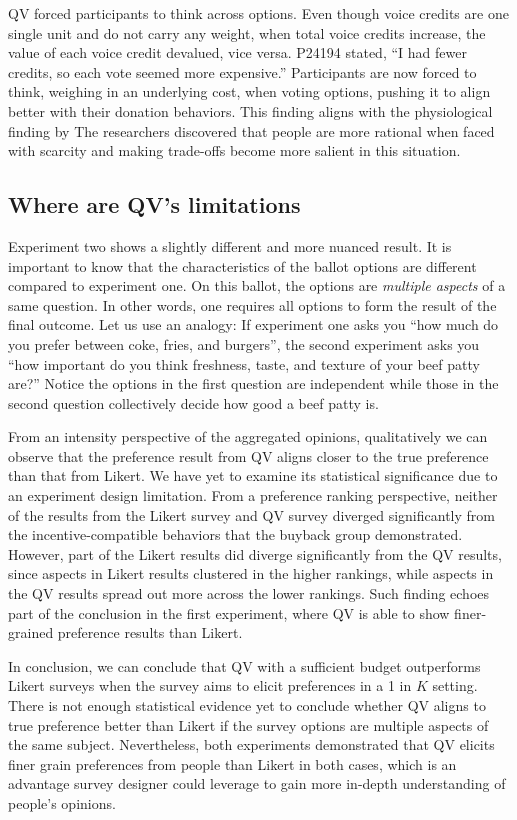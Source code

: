 QV forced participants to think across options. 
Even though voice credits are one single unit 
and do not carry any weight, 
when total voice credits increase, 
the value of each voice credit devalued, 
vice versa. 
P24194 stated, 
``I had fewer credits, so each vote seemed more expensive.''
Participants are now forced to think, weighing in an underlying cost, when voting options, pushing it to align better with their donation behaviors.
This finding aligns with the physiological finding by \textcite{Shah2015a}
The researchers discovered that people are more rational when faced with scarcity and making trade-offs become more salient in this situation.


\subsection{Where are QV's limitations}
Experiment two shows a slightly different and more nuanced result.
It is important to know that
the characteristics of the ballot options 
are different compared to experiment one.
On this ballot, the options are \textit{multiple aspects}
of a same question.
In other words, 
one requires all options 
to form the result of the final outcome.
Let us use an analogy:
If experiment one asks you
``how much do you prefer between
coke, fries, and burgers'',
the second experiment asks you
``how important do you think
freshness, taste, and texture 
of your beef patty are?''
Notice the options in the first question 
are independent while 
those in the second question 
collectively decide how good a beef patty is.

From an intensity perspective 
of the aggregated opinions, 
qualitatively we can observe that 
the preference result from QV aligns closer 
to the true preference than that from Likert. 
We have yet to examine its statistical significance 
due to an experiment design limitation. 
From a preference ranking perspective, 
neither of the results from the Likert survey 
and QV survey 
diverged significantly 
from the incentive-compatible behaviors 
that the buyback group demonstrated. 
However, part of the Likert results 
did diverge significantly from the QV results, 
since aspects in Likert results clustered 
in the higher rankings, 
while aspects in the QV results 
spread out more across the lower rankings. 
Such finding echoes part of the conclusion 
in the first experiment, 
where QV is able to show finer-grained preference results 
than Likert.

In conclusion,
we can conclude that QV with a sufficient budget outperforms Likert surveys when the survey aims to elicit preferences in a 1 in $K$ setting.
There is not enough statistical evidence yet to conclude whether QV aligns to true preference better than Likert if the survey options are multiple aspects of the same subject. Nevertheless, both experiments demonstrated that QV elicits finer grain preferences from people than Likert in both cases, which is an advantage survey designer could leverage to gain more in-depth understanding of people's opinions.

